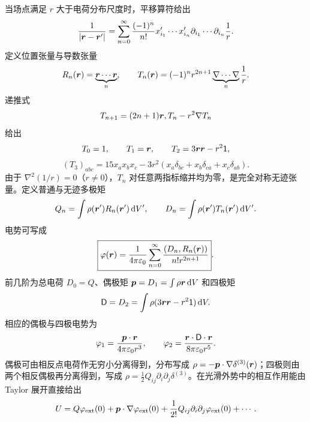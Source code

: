当场点满足 $r$ 大于电荷分布尺度时，平移算符给出
\[
 \frac1{|\bm{r}-\bm{r}'|}
 =\sum_{n=0}^\infty\frac{(-1)^n}{n!}
 x'_{i_1}\cdots x'_{i_n}
 \partial_{i_1}\cdots\partial_{i_n}\frac1r.
\]
定义位置张量与导数张量
\[
 R_n(\bm{r})=\underbrace{\bm{r}\cdots\bm{r}}_{n},
 \qquad
 T_n(\bm{r})=(-1)^nr^{2n+1}
 \underbrace{\nabla\cdots\nabla}_{n}\frac1r.
\]
递推式
\[
 T_{n+1}=(2n+1)\bm{r},T_n-r^2\nabla T_n
\]
给出
\[
 T_0=1,\qquad T_1=\bm{r},\qquad
 T_2=3\bm{r}\bm{r}-r^2\mathsf1,
\]
\[
 (T_3)_{abc}=15x_ax_bx_c
 -3r^2(x_a\delta_{bc}+x_b\delta_{ca}+x_c\delta_{ab}).
\]
由于 $\nabla^2(1/r)=0$（$r\ne0$），$T_n$ 对任意两指标缩并均为零，是完全对称无迹张量。定义普通与无迹多极矩
\[
 Q_n=\int\rho(\bm{r}')R_n(\bm{r}')\mathop{}\!\mathrm d V',
 \qquad
 D_n=\int\rho(\bm{r}')T_n(\bm{r}')\mathop{}\!\mathrm d V'.
\]
电势可写成
\[
 \boxed{\varphi(\bm{r})=\frac1{4\pi\varepsilon_0}
 \sum_{n=0}^\infty\frac{(D_n,R_n(\bm{r}))}{n!r^{2n+1}}}.
\]
前几阶为总电荷 $D_0=Q$、偶极矩
$\bm{p}=D_1=\int\rho\bm{r}\mathop{}\!\mathrm d V$ 和四极矩
\[
 \mathsf D=D_2=\int\rho(3\bm{r}\bm{r}-r^2\mathsf1)\mathop{}\!\mathrm d V.
\]
相应的偶极与四极电势为
\[
 \varphi_1=\frac{\bm{p}\cdot\bm{r}}{4\pi\varepsilon_0r^3},
 \qquad
 \varphi_2=\frac{\bm{r}\cdot\mathsf D\cdot\bm{r}}
 {8\pi\varepsilon_0r^5}.
\]
偶极可由相反点电荷作无穷小分离得到，分布写成
$\rho=-\bm{p}\cdot\nabla\delta^{(3)}(\bm{r})$；四极则由两个相反偶极再分离得到，写成
$\rho=\tfrac12Q_{ij}\partial_i\partial_j\delta^{(3)}$。在光滑外势中的相互作用能由 Taylor 展开直接给出
\[
 U=Q\varphi_{\rm ext}(0)+\bm{p}\cdot\nabla\varphi_{\rm ext}(0)
 +\frac1{2!}Q_{ij}\partial_i\partial_j\varphi_{\rm ext}(0)+\cdots.
\]

